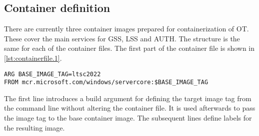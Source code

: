 
\subsection{Container definition}
There are currently three container images prepared for containerization of \ac{OT}. These cover the main services for \ac{GSS}, \ac{LSS} and \ac{AUTH}. The structure is the same for each of the container files. The first part of the container file is shown in \autoref{lst:containerfile.1}.
\begin{lstlisting}[label=lst:containerfile.1, caption={Containerfile for the \ac{GSS}. Description of the base image and variable tagging using a build argument. (\textit{Distribution/Container/globalsession.Containerfile})}, language=docker, firstnumber=1]
ARG BASE_IMAGE_TAG=ltsc2022
FROM mcr.microsoft.com/windows/servercore:$BASE_IMAGE_TAG
\end{lstlisting}
The first line introduces a build argument for defining the target image tag from the command line without altering the container file.  It is used afterwards to pass the image tag to the base container image. The subsequent lines define labels for the resulting image.

\begin{comment}
\begin{lstlisting}[label=lst:containerfile.2, caption={Containerfile for the \ac{GSS}. First part describes the base image and the meta data of the image. (\textit{Distribution/Container/globalsession.Containerfile})}, language=docker, firstnumber=1]
LABEL maintainer="Frankfurt UAS"
LABEL app="open_twin.globalsession"

ENV SIM_PLAT_ROOT="" \
OPEN_TWIN_CERTS_PATH="C:\\app\\Certificates\\" \
OPEN_TWIN_CA_CERT="C:\\app\\Certificates\\ca.pem" \
OPEN_TWIN_SERVER_CERT="C:\\app\\Certificates\\server.pem" \
OPEN_TWIN_SERVER_CERT_KEY="C:\\app\\Certificates\\server-key.pem"

ENV OPEN_TWIN_GSS_SERVICE_ADDRESS=127.0.0.1 \
OPEN_TWIN_AUTH_SERVICE_ADDRESS=127.0.0.1 \
OPEN_TWIN_MONGODB_ADDRESS=tls@127.0.0.1:27017 \
OPEN_TWIN_GSS_PORT=8091 \
OPEN_TWIN_LSS_PORT=8093 \
OPEN_TWIN_AUTH_PORT=8092 \
OPEN_TWIN_GDS_PORT=9094 \
OPEN_TWIN_LDS_PORT=9095
\end{lstlisting}
\end{comment}

